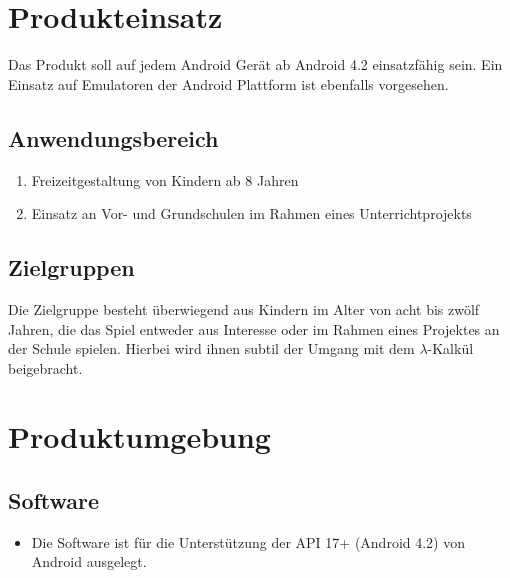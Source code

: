 \documentclass{scrartcl}
\begin{document}
\clearpage









\section{Produkteinsatz}

Das Produkt soll auf jedem Android Gerät ab Android 4.2 einsatzfähig sein. Ein Einsatz auf Emulatoren der Android Plattform ist ebenfalls vorgesehen.

\subsection{Anwendungsbereich}

\begin{enumerate}
	\item Freizeitgestaltung von Kindern ab 8 Jahren
	\item Einsatz an Vor- und Grundschulen im Rahmen eines Unterrichtprojekts
\end{enumerate}

\subsection{Zielgruppen}

Die Zielgruppe besteht überwiegend aus Kindern im Alter von acht bis zwölf Jahren, die das Spiel entweder aus Interesse oder im Rahmen eines Projektes an der Schule spielen. Hierbei wird ihnen subtil der Umgang mit dem $\lambda$-Kalkül beigebracht.

\clearpage








\section{Produktumgebung}

\subsection{Software}

\begin{itemize}
	\item Die Software ist für die Unterstützung der API 17+ (Android 4.2) von Android ausgelegt.
\end{itemize}
\end{document}
